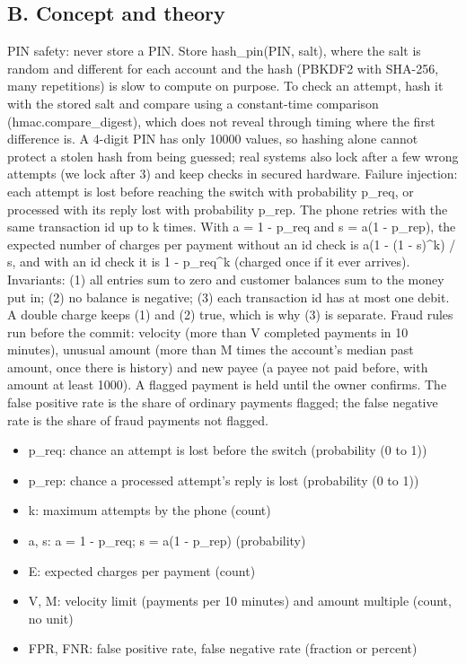 \documentclass[11pt,a4paper]{article}
\begin{document}
\subsection*{B. Concept and theory}
PIN safety: never store a PIN. Store hash\_pin(PIN, salt), where the salt is random and different for each account and the hash (PBKDF2 with SHA-256, many repetitions) is slow to compute on purpose. To check an attempt, hash it with the stored salt and compare using a constant-time comparison (hmac.compare\_digest), which does not reveal through timing where the first difference is. A 4-digit PIN has only 10000 values, so hashing alone cannot protect a stolen hash from being guessed; real systems also lock after a few wrong attempts (we lock after 3) and keep checks in secured hardware. Failure injection: each attempt is lost before reaching the switch with probability p\_req, or processed with its reply lost with probability p\_rep. The phone retries with the same transaction id up to k times. With a = 1 - p\_req and s = a(1 - p\_rep), the expected number of charges per payment without an id check is a(1 - (1 - s)\textasciicircum{}k) / s, and with an id check it is 1 - p\_req\textasciicircum{}k (charged once if it ever arrives). Invariants: (1) all entries sum to zero and customer balances sum to the money put in; (2) no balance is negative; (3) each transaction id has at most one debit. A double charge keeps (1) and (2) true, which is why (3) is separate. Fraud rules run before the commit: velocity (more than V completed payments in 10 minutes), unusual amount (more than M times the account's median past amount, once there is history) and new payee (a payee not paid before, with amount at least 1000). A flagged payment is held until the owner confirms. The false positive rate is the share of ordinary payments flagged; the false negative rate is the share of fraud payments not flagged.

\begin{itemize}[nosep]
\item p\_req: chance an attempt is lost before the switch (probability (0 to 1))
\item p\_rep: chance a processed attempt's reply is lost (probability (0 to 1))
\item k: maximum attempts by the phone (count)
\item a, s: a = 1 - p\_req; s = a(1 - p\_rep) (probability)
\item E: expected charges per payment (count)
\item V, M: velocity limit (payments per 10 minutes) and amount multiple (count, no unit)
\item FPR, FNR: false positive rate, false negative rate (fraction or percent)
\end{itemize}
\end{document}

